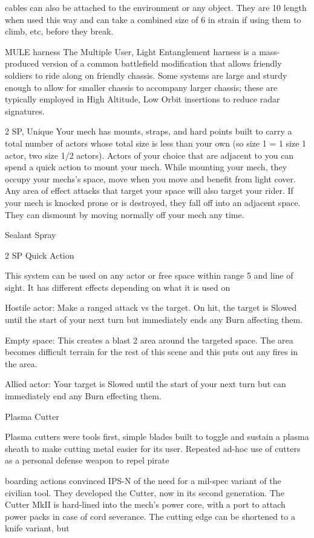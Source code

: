 cables can also be attached to the environment or any object. They are 10 length when used this
way and can take a combined size of 6 in strain if using them to climb, etc, before they break.


MULE harness
The Multiple User, Light Entanglement harness is a mass-produced version of a common battlefield
modification that allows friendly soldiers to ride along on friendly chassis. Some systems are large and
sturdy enough to allow for smaller chassis to accompany larger chassis; these are typically employed in
High Altitude, Low Orbit insertions to reduce radar signatures.

2 SP, Unique
Your mech has mounts, straps, and hard points built to carry a total number of actors whose
total size is less than your own (so size 1 = 1 size 1 actor, two size 1/2 actors). Actors of your
choice that are adjacent to you can spend a quick action to mount your mech. While mounting
your mech, they occupy your mechs’s space, move when you move and benefit from light cover.
Any area of effect attacks that target your space will also target your rider. If your mech is
knocked prone or is destroyed, they fall off into an adjacent space. They can dismount by
moving normally off your mech any time.

Sealant Spray

2 SP
Quick Action

This system can be used on any actor or free space within range 5 and line of sight. It has
different effects depending on what it is used on

         	Hostile actor: Make a ranged attack vs the target. On hit, the target is Slowed until the
         start of your next turn but immediately ends any Burn affecting them.

         	Empty space: This creates a blast 2 area around the targeted space. The area becomes
         difficult terrain for the rest of this scene and this puts out any fires in the area.

         Allied actor: 	  Your target is Slowed until the start of your next turn but can immediately
         end any Burn effecting them.


Plasma Cutter


Plasma cutters were tools first, simple blades built to toggle and sustain a plasma sheath to make cutting
metal easier for its user. Repeated ad-hoc use of cutters as a personal defense weapon to repel pirate

boarding actions convinced IPS-N of the need for a mil-spec variant of the civilian tool. They developed the
Cutter, now in its second generation. The Cutter MkII is hard-lined into the mech’s power core, with a port
to attach power packs in case of cord severance. The cutting edge can be shortened to a knife variant, but

